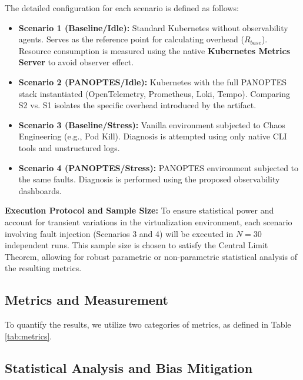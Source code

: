 The detailed configuration for each scenario is defined as follows:
\begin{itemize}
    \item \textbf{Scenario 1 (Baseline/Idle):} Standard Kubernetes without observability agents. Serves as the reference point for calculating overhead ($R_{base}$). Resource consumption is measured using the native \textbf{Kubernetes Metrics Server} to avoid observer effect.
    \item \textbf{Scenario 2 (PANOPTES/Idle):} Kubernetes with the full PANOPTES stack instantiated (OpenTelemetry, Prometheus, Loki, Tempo). Comparing S2 vs. S1 isolates the specific overhead introduced by the artifact.
    \item \textbf{Scenario 3 (Baseline/Stress):} Vanilla environment subjected to Chaos Engineering (e.g., Pod Kill). Diagnosis is attempted using only native CLI tools and unstructured logs.
    \item \textbf{Scenario 4 (PANOPTES/Stress):} PANOPTES environment subjected to the same faults. Diagnosis is performed using the proposed observability dashboards.
\end{itemize}
\textbf{Execution Protocol and Sample Size:} To ensure statistical power and account for transient variations in the virtualization environment, each scenario involving fault injection (Scenarios 3 and 4) will be executed in $N = 30$ independent runs. This sample size is chosen to satisfy the Central Limit Theorem, allowing for robust parametric or non-parametric statistical analysis of the resulting metrics.
\subsection{Metrics and Measurement}
\label{sec:metrics}

To quantify the results, we utilize two categories of metrics, as defined in Table \ref{tab:metrics}.



\subsection{Statistical Analysis and Bias Mitigation}
\label{sec:statistical_analysis}

